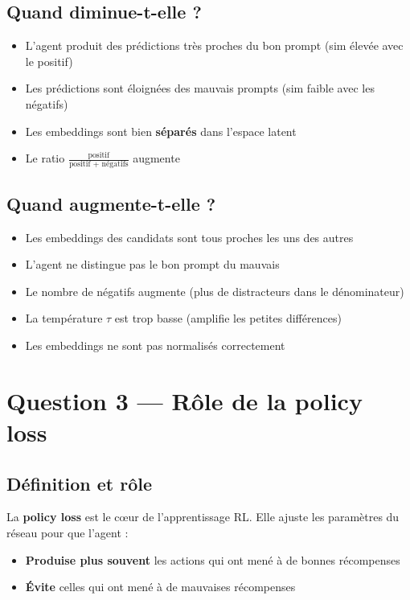 \documentclass[11pt,a4paper]{article}
\begin{document}
\subsection{Quand diminue-t-elle ?}

\begin{itemize}
    \item L'agent produit des prédictions très proches du bon prompt (sim élevée avec le positif)
    \item Les prédictions sont éloignées des mauvais prompts (sim faible avec les négatifs)
    \item Les embeddings sont bien \textbf{séparés} dans l'espace latent
    \item Le ratio $\frac{\text{positif}}{\text{positif + négatifs}}$ augmente
\end{itemize}

\subsection{Quand augmente-t-elle ?}

\begin{itemize}
    \item Les embeddings des candidats sont tous proches les uns des autres
    \item L'agent ne distingue pas le bon prompt du mauvais
    \item Le nombre de négatifs augmente (plus de distracteurs dans le dénominateur)
    \item La température $\tau$ est trop basse (amplifie les petites différences)
    \item Les embeddings ne sont pas normalisés correctement
\end{itemize}

\section{Question 3 — Rôle de la policy loss}

\subsection{Définition et rôle}

La \textbf{policy loss} est le cœur de l'apprentissage RL. Elle ajuste les paramètres du réseau pour que l'agent :
\begin{itemize}
    \item \textbf{Produise plus souvent} les actions qui ont mené à de bonnes récompenses
    \item \textbf{Évite} celles qui ont mené à de mauvaises récompenses
\end{itemize}
\end{document}
